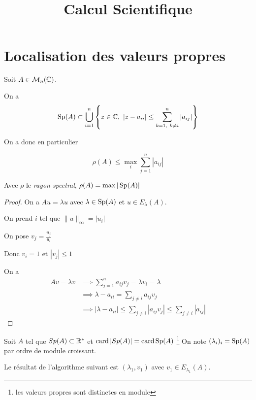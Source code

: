 \documentclass{article}
\title{Calcul Scientifique}
\begin{document}
\maketitle
\section{Localisation des valeurs propres}
\begin{theorem}
	Soit $A \in \mathcal{M}_n(\mathbb{C})$.

	On a \[
		\operatorname{Sp}(A) \subset \bigcup_{i=1}^n \left\{z\in \mathbb{C},\ |z - a_{ii}| \le \sum_{k=1,\ k\neq i}^{n} |a_{ij}| \right\} 
	\] 

	On a donc en particulier

	\[
		\rho(A) \le \max_{i} \sum_{j=1}^{n} |a_{ij}|
	\] 

	Avec $\rho$ le  \emph{rayon spectral}, $\rho(A) = \max |\operatorname{Sp}(A)|$
\end{theorem}

\begin{proof}
	On a $Au = \lambda u$ avec $\lambda\in \operatorname{Sp}(A)$ et $u \in E_{\lambda}(A)$.

	On prend $i$ tel que $\|u\|_{\infty} = |u_i|$

	On pose $v_j = \displaystyle\frac{u_j}{u_i}$

	Donc $v_i = 1$ et $|v_j| \le 1$

	On a 
	\begin{align*}
		Av = \lambda v &\implies \sum_{j=1}^{n} a_{ij} v_j = \lambda v_i = \lambda \\
			       &\implies \lambda - a_{ii} = \sum_{j\neq i} a_{ij} v_j \\
			       &\implies |\lambda - a_{ii}| \le \sum_{j\neq i} |a_{ij} v_j| \le \sum_{j\neq i} |a_{ij}| 
	\end{align*}
\end{proof}

\begin{theorem}
	Soit $A$ tel que $Sp(A) \subset \mathbb{R}^\ast$ et $\operatorname{card} |Sp(A)| = \operatorname{card} \operatorname{Sp}(A)$ \footnote{les valeurs propres sont distinctes en module}
	On note $(\lambda_i)_i = \operatorname{Sp}(A)$ par ordre de module croissant.

	Le résultat de l'algorithme suivant est $(\lambda_1, v_1)$ avec  $v_1 \in E_{\lambda_1}(A)$.

	\begin{algorithmic}
	\end{algorithmic}
\end{theorem}
\end{document}
